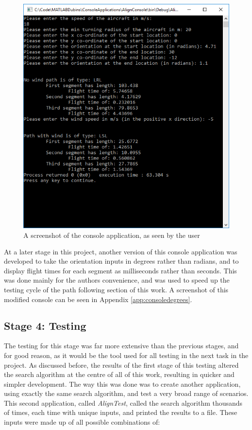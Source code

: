 \begin{figure}%
\centering    
\includegraphics[width=\textwidth]{Console_Demo}
\caption[Screenshot of the finalised console application]{A screenshot of the console application, as seen by the user}
\label{fig:consoledemo}
\end{figure}

At a later stage in this project, another version of this console application was developed to take the orientation inputs in degrees rather than radians, and to display flight times for each segment as milliseconds rather than seconds. This was done mainly for the authors convenience, and was used to speed up the testing cycle of the path following section of this work. A screenshot of this modified console can be seen in Appendix \ref{app:consoledegrees}.

\subsection{Stage 4: Testing}
\label{task1:stage4:testing}

The testing for this stage was far more extensive than the previous stages, and for good reason, as it would be the tool used for all testing in the next task in the project. As discussed before, the results of the first stage of this testing altered the search algorithm at the centre of all of this work, resulting in quicker and simpler development. The way this was done was to create another application, using exactly the same search algorithm, and test a very broad range of scenarios. This second application, called \textit{AlignTest}, called the search algorithm thousands of times, each time with unique inputs, and printed the results to a file. These inputs were made up of all possible combinations of:

